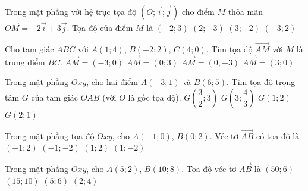 \begin{ex}%
	Trong mặt phẳng với hệ trục tọa độ $\left(O;  \overrightarrow{i}; \overrightarrow{j}\right)$ cho điểm $M$ thỏa mãn $\overrightarrow{O M}=-2 \overrightarrow{i}+3 \overrightarrow{j}$. Tọa độ của điểm $M$ là
	 \choice
		{\True  $(-2; 3)$}
		 {$(2;-3)$}
		{$(3;-2)$} 
		 {$(-3; 2)$}
\end{ex}

\begin{ex}%
	Cho tam giác  $ABC$ với $A(1;4)$, $B(-2;2)$, $C(4;0)$. Tìm tọa độ $\overrightarrow{AM}$ với $M$ là trung điểm $BC$.
	 \choice
		 {$\overrightarrow{AM}=(-3;0)$}
		 {$\overrightarrow{AM}=(0;3)$}
		{\True  $\overrightarrow{AM}=(0;-3)$}
		 {$\overrightarrow{AM}=(3;0)$}
\end{ex}

\begin{ex}%
	Trong mặt phẳng $Oxy$, cho hai điểm $A\left(-3;1\right)$ và $B\left(6;5\right)$.  Tìm tọa độ trọng tâm $G$ của tam giác $OAB$ (với $O$ là gốc tọa độ).
	\choice 
		 {$G\left(\dfrac{3}{2};3\right)$}
		 {$G\left(3;\dfrac{4}{3}\right)$}
		{\True  $G\left(1;2\right)$}
		{$G\left(2;1\right)$} 
\end{ex}

\begin{ex}%
	Trong mặt phẳng tọa độ $ Oxy $, cho $ A(-1;0) $,  $ B(0;2) $. Véc-tơ $ \overrightarrow{AB} $ có tọa độ là
	 \choice
		{$ (-1;2)  $}
		 {$ (-1;-2) $}
		{\True  $ (1;2) $}
		{$ (1;-2)  $}
\end{ex}

\begin{ex}%
	Trong mặt  phẳng $Oxy$, cho $A(5;2)$, $B(10;8)$. Tọa độ véc-tơ $\overrightarrow{AB}$ là
	\choice 
		{$(50;6)$} 
		 {$(15;10)$}
		 {\True $(5;6)$}
		{$(2;4)$} 
\end{ex}

